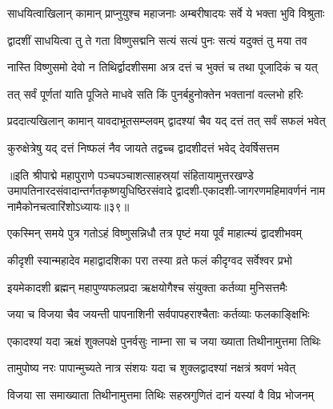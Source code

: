\twolineshloka
{साधयित्वाखिलान् कामान् प्राप्नुयुश्च महाजनाः}
{अम्बरीषादयः सर्वे ये भक्ता भुवि विश्रुताः}%

\twolineshloka
{द्वादशीं साधयित्वा तु ते गता विष्णुसद्मनि}
{सत्यं सत्यं पुनः सत्यं यदुक्तं तु मया तव}%

\twolineshloka
{नास्ति विष्णुसमो देवो न तिथिर्द्वादशीसमा}
{अत्र दत्तं च भुक्तं च तथा पूजादिकं च यत्}%

\twolineshloka
{तत् सर्वं पूर्णतां याति पूजिते माधवे सति}
{किं पुनर्बहुनोक्तेन भक्तानां वल्लभो हरिः}%

\twolineshloka
{प्रददात्यखिलान् कामान् यावदाभूतसम्प्लवम्}
{द्वादश्यां चैव यद् दत्तं तत् सर्वं सफलं भवेत्}%

\twolineshloka
{कुरुक्षेत्रेषु यद् दत्तं निष्फलं नैव जायते}
{तद्वच्च द्वादशीदत्तं भवेद् देवर्षिसत्तम}%

॥इति श्रीपाद्मे महापुराणे पञ्चपञ्चाशत्साहस्र्यां संहितायामुत्तरखण्डे उमापतिनारदसंवादान्तर्गतकृष्णयुधिष्ठिरसंवादे द्वादशी-एकादशी-जागरणमहिमावर्णनं नाम नामैकोनचत्वारिंशोऽध्यायः॥३९॥

\genMangalaShloka

\hyperref[sec:ekadashi_mahatmyam_padma_puranam]{\closesub}
\clearpage

\label{sec:padma-margashirsha-krishna-utpanna}

\ganapatyadiDhyanam
\padmaPuranam


\twolineshloka
{एकस्मिन् समये पुत्र गतोऽहं विष्णुसन्निधौ}
{तत्र पृष्टं मया पूर्वं माहात्म्यं द्वादशीभवम्}%


\twolineshloka
{कीदृशी स्यान्महादेव महाद्वादशिका परा}
{तस्या व्रते फलं कीदृग्वद सर्वेश्वर प्रभो}%


\twolineshloka
{इयमेकादशी ब्रह्मन् महापुण्यफलप्रदा}
{ऋक्षयोगैश्च संयुक्ता कर्तव्या मुनिसत्तमैः}%

\twolineshloka
{जया च विजया चैव जयन्ती पापनाशिनी}
{सर्वपापहराश्चैताः कर्तव्याः फलकाङ्क्षिभिः}%

\twolineshloka
{एकादश्यां यदा ऋक्षं शुक्लपक्षे पुनर्वसुः}
{नाम्ना सा च जया ख्याता तिथीनामुत्तमा तिथिः}%

\twolineshloka
{तामुपोष्य नरः पापान्मुच्यते नात्र संशयः}
{यदा च शुक्लद्वादश्यां नक्षत्रं श्रवणं भवेत्}%

\twolineshloka
{विजया सा समाख्याता तिथीनामुत्तमा तिथिः}
{सहस्रगुणितं दानं यस्यां वै विप्र भोजनम्}%

